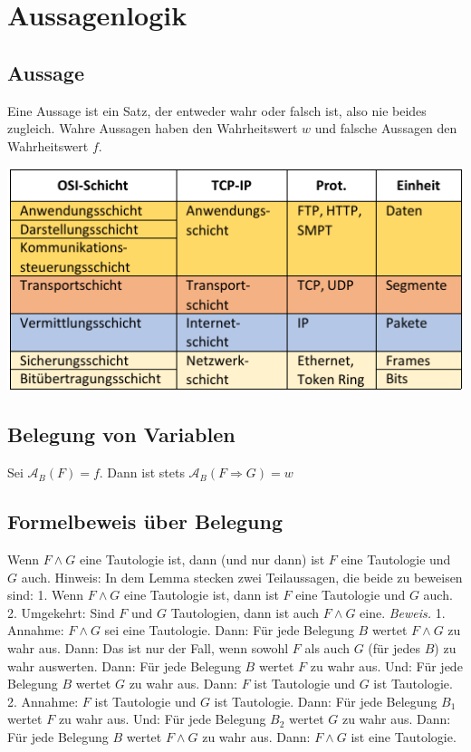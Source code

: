 \section{Aussagenlogik}
\subsection*{Aussage}
Eine Aussage ist ein Satz, der entweder wahr oder falsch ist, also nie beides zugleich.
Wahre Aussagen haben den Wahrheitswert $w$ und falsche Aussagen den
Wahrheitswert $f$.
\begin{center}
	\includegraphics[width=0.8\columnwidth]{Resources/osi2.pdf}
\end{center}
\subsection*{Belegung von Variablen}
Sei $\mathcal{A}_B(F) = f$.
Dann ist stets $\mathcal{A}_B(F\Rightarrow G) = w$
\subsection*{Formelbeweis über Belegung}
Wenn $F \wedge G$ eine Tautologie ist, dann (und nur dann) ist $F$ eine Tautologie und $G$ auch.
Hinweis: In dem Lemma stecken zwei Teilaussagen, die beide zu beweisen sind:
1. Wenn $F \wedge G$ eine Tautologie ist, dann ist $F$ eine Tautologie und $G$ auch.
2. Umgekehrt: Sind $F$ und $G$ Tautologien, dann ist auch $F \wedge G$ eine.
\emph{Beweis.}
1. Annahme: $F \wedge G$ sei eine Tautologie.
Dann: Für jede Belegung $B$ wertet $F \wedge G$ zu wahr aus.
Dann: Das ist nur der Fall, wenn sowohl $F$ als auch $G$ (für jedes $B$) zu wahr auswerten.
Dann: Für jede Belegung $B$ wertet $F$ zu wahr aus. Und:
Für jede Belegung $B$ wertet $G$ zu wahr aus.
Dann: $F$ ist Tautologie und $G$ ist Tautologie.
2. Annahme: $F$ ist Tautologie und $G$ ist Tautologie.
Dann: Für jede Belegung $B_1$ wertet $F$ zu wahr aus. Und: Für jede Belegung $B_2$ wertet $G$ zu wahr aus.
Dann: Für jede Belegung $B$ wertet $F \wedge G$ zu wahr aus.
Dann: $F \wedge G$ ist eine Tautologie.
